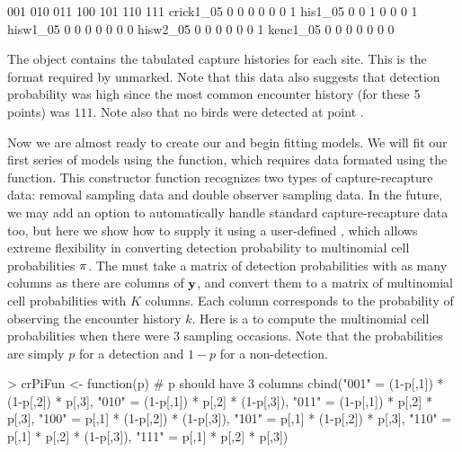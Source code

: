 \documentclass[a4paper]{article}
\renewenvironment{Schunk}{\vspace{\topsep}}{\vspace{\topsep}}
\begin{document}
\begin{Schunk}
\begin{Soutput}
            001 010 011 100 101 110 111
  crick1_05   0   0   0   0   0   0   1
  his1_05     0   0   1   0   0   0   1
  hisw1_05    0   0   0   0   0   0   0
  hisw2_05    0   0   0   0   0   0   1
  kenc1_05    0   0   0   0   0   0   0
\end{Soutput}
\end{Schunk}

The object  contains the tabulated capture histories for
each site. This is the format required by unmarked. Note that this
data also suggests that detection probability was high since the most
common encounter history (for these 5 points) was $111$. Note also that
no birds were detected at point .

Now we are almost ready to create our  and begin
fitting models. We will fit our first series of models using the
 function, which requires data formated using the
 function. This constructor function
recognizes two types of capture-recapture data: removal sampling
data and double observer sampling data. In the future, we may add an
option to automatically handle standard capture-recapture data too,
but here we show how to supply it using a user-defined ,
which allows extreme flexibility in converting detection probability
to multinomial cell probabilities $\bold \pi$. The  must
take a matrix of detection probabilities with as many columns as there
are columns of $\bf y$, and convert them to a matrix of multinomial
cell probabilities with $K$ columns. Each column corresponds to the
probability of observing the encounter history $k$. Here is a
 to compute the multinomial cell probabilities when there
were 3 sampling occasions. Note that the probabilities are simply $p$
for a detection and $1-p$ for a non-detection.

\begin{Schunk}
\begin{Sinput}
> crPiFun <- function(p) { # p should have 3 columns
     cbind("001" = (1-p[,1]) * (1-p[,2]) * p[,3],
           "010" = (1-p[,1]) * p[,2]     * (1-p[,3]),
           "011" = (1-p[,1]) * p[,2]     * p[,3],
           "100" = p[,1]     * (1-p[,2]) * (1-p[,3]),
           "101" = p[,1]     * (1-p[,2]) * p[,3],
           "110" = p[,1]     * p[,2]     * (1-p[,3]),
           "111" = p[,1]     * p[,2]     * p[,3])
 }
\end{Sinput}
\end{Schunk}
\end{document}
